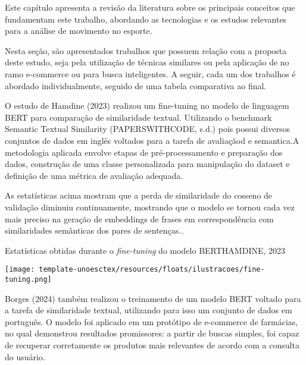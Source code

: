 \label{cap:revisao-literatura}

Este capítulo apresenta a revisão da literatura sobre os principais conceitos que fundamentam este trabalho, abordando as tecnologias e os estudos relevantes para a análise de movimento no esporte.

\label{sec:trabalhos-relacionados}

Nesta seção, são apresentados trabalhos que possuem relação com a proposta deste estudo, 
seja pela utilização de técnicas similares ou pela aplicação de  no ramo e-commerce ou para busca inteligentes. A seguir, cada um dos trabalhos é abordado individualmente, seguido de uma tabela comparativa ao final.


O estudo de Hamdine (2023) realizou um fine-tuning no modelo de linguagem BERT para comparação de similaridade textual. Utilizando o benchmark Semantic Textual Similarity  (PAPERSWITHCODE, s.d.) pois possui
diversos conjuntos de dados em inglês voltados para a tarefa de avaliaçãod e semantica.A metodologia aplicada envolve etapas de pré-processamento e preparação dos dados, construção de uma classe personalizada para manipulação do dataset e definição de uma métrica de avaliação adequada.

As estatísticas acima mostram que a perda de similaridade do cosseno de validação
diminuiu continuamente, mostrando que o modelo se tornou cada vez mais preciso na geração de embeddings de frases em correspondência com similaridades semânticas
dos pares de sentenças..

\begin{figura}{Estatísticas obtidas durante o \textit{fine-tuning} do modelo BERT}{HAMDINE, 2023}
    \begin{flushleft}
        \label{fig:Futebol}
        \texttt{[image: template-unoesctex/resources/floats/ilustracoes/fine-tuning.png]}
    \end{flushleft}
\end{figura}
\FloatBarrier


Borges (2024) também realizou o treinamento de um modelo BERT voltado para a tarefa de similaridade textual, 
utilizando para isso um conjunto de dados em português. O modelo foi aplicado em um protótipo de e-commerce de farmácias, 
no qual demonstrou resultados promissores: a partir de buscas simples, foi capaz de recuperar corretamente os 
produtos mais relevantes de acordo com a consulta do usuário.

